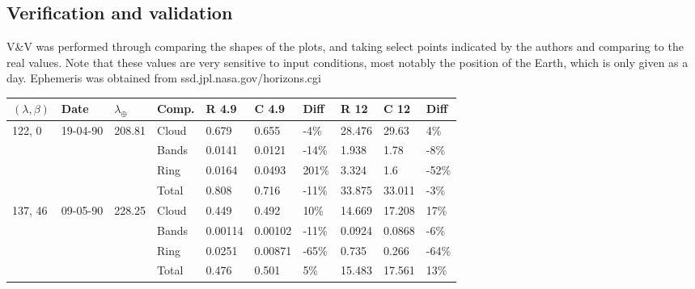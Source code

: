 \documentclass[a4paper,10pt]{article}
\begin{document}
\subsection{Verification and validation}
V\&V was performed through comparing the shapes of the plots, and taking select points indicated by the authors and comparing to the real values. Note that these values are very sensitive to input conditions, most notably the position of the Earth, which is only given as a day. Ephemeris was obtained from ssd.jpl.nasa.gov/horizons.cgi

\begin{table}[]
\begin{tabular}{lll|l|llllll}
\hline
$(\lambda, \beta)$ & \textbf{Date} & $\lambda_{\oplus}$ & \textbf{Comp.} & \textbf{R} 4.9 & \textbf{C} 4.9 & \textbf{Diff} & \textbf{R} 12 & \textbf{C} 12& \textbf{Diff} \\ \hline
122, 0                   & 19-04-90    & 208.81           & Cloud       & 0.679            & 0.655             & -4\%          & 28.476          & 29.63            & 4\%           \\
                         &               &                  & Bands         & 0.0141           & 0.0121            & -14\%         & 1.938           & 1.78             & -8\%          \\
                         &               &                  & Ring         & 0.0164           & 0.0493            & 201\%         & 3.324           & 1.6              & -52\%         \\ \hline
                         &               &                  & Total              & 0.808            & 0.716             & -11\%         & 33.875          & 33.011           & -3\%          \\ \hline
137, 46                  & 09-05-90    & 228.25           & Cloud       & 0.449            & 0.492             & 10\%          & 14.669          & 17.208           & 17\%          \\
                         &               &                  & Bands         & 0.00114          & 0.00102           & -11\%         & 0.0924          & 0.0868           & -6\%          \\
                         &               &                  & Ring         & 0.0251           & 0.00871           & -65\%         & 0.735           & 0.266            & -64\%         \\ \hline
                         &               &                  & Total              & 0.476            & 0.501             & 5\%           & 15.483          & 17.561           & 13\%          \\ \hline
\end{tabular}
\end{table}
\end{document}
